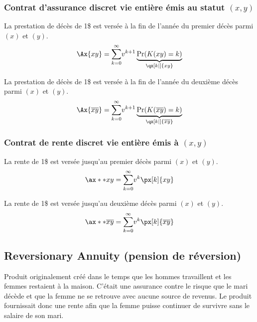 \documentclass[10pt, french]{article}
\begin{document}
\begin{multicols*}{2}
\subsubsection*{Contrat d'assurance discret vie entière émis au statut $(x, y)$}
La prestation de décès de 1\$ est versée à la fin de l'année du premier décès parmi $(x)$ et $(y)$.
\begin{align*}
	\Ax{xy}
	&=	\sumz{\infty}{k = 0} v^{k + 1} \underbrace{\Pr(K(xy) = k)}_{\qx[k|]{xy}}	\\
\end{align*}

La prestation de décès de 1\$ est versée à la fin de l'année du deuxième décès parmi $(x)$ et $(y)$.
\begin{align*}
	\Ax{\overline{xy}}
	&=	\sumz{\infty}{k = 0} v^{k + 1} \underbrace{\Pr(K(\overline{xy}) = k)}_{\qx[k|]{\overline{xy}}}	\\
\end{align*}


\subsubsection*{Contrat de rente discret vie entière émis à $(x, y)$}
La rente de 1\$ est versée jusqu'au premier décès parmi $(x)$ et $(y)$.
\begin{align*}
	\ax**{xy}
	&=	\sumz{\infty}{k = 0}	v^{k} \px[k]{xy}	\\
\end{align*}

La rente de 1\$ est versée jusqu'au deuxième décès parmi $(x)$ et $(y)$.
\begin{align*}
	\ax**{\overline{xy}}
	&=	\sumz{\infty}{k = 0}	v^{k} \px[k]{\overline{xy}}	\\
\end{align*}

\columnbreak

\subsection*{Reversionary Annuity (pension de réversion)}
\begin{rappel_enhanced}[Historique]
Produit originalement créé dans le temps que les hommes travaillent et les femmes restaient à la maison. C'était une assurance contre le risque que le mari décède et que la femme ne se retrouve avec aucune source de revenus. Le produit fournissait donc une rente afin que la femme puisse continuer de survivre sans le salaire de son mari.
\end{rappel_enhanced}


\end{multicols*}
\end{document}
